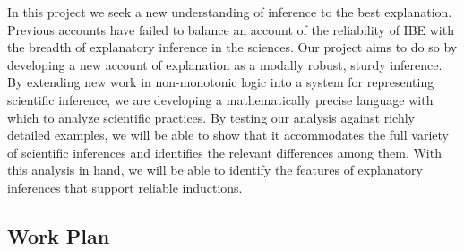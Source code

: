 \documentclass{article}[11pt]
\begin{document}
In this project we seek a new understanding of inference to the best explanation.  Previous accounts have failed to balance an account of the reliability of IBE with the breadth of explanatory inference in the sciences.  Our project aims to do so by developing a new account of explanation as a modally robust, sturdy inference.  By extending new work in non-monotonic logic into a system for representing scientific inference, we are developing a mathematically precise language with which to analyze scientific practices.  By testing our analysis against richly detailed examples, we will be able to show that it accommodates the full variety of scientific inferences and identifies the relevant differences among them.  With this analysis in hand, we will be able to identify the features of explanatory inferences that support reliable inductions.




\clearpage
{}
\subsection{Work Plan}


%
\end{document}
